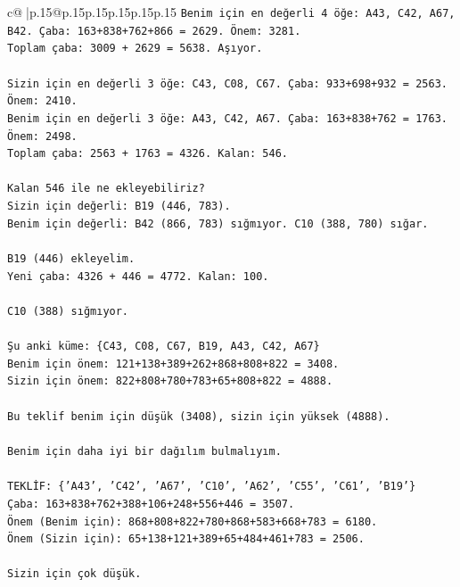 \documentclass{article}
\begin{document}
{\begin{supertabular}{c@{$\;$}|p{.15\linewidth}@{}p{.15\linewidth}p{.15\linewidth}p{.15\linewidth}p{.15\linewidth}p{.15\linewidth}}
{{{\texttt{Benim için en değerli 4 öğe: A43, C42, A67, B42. Çaba: 163+838+762+866 = 2629. Önem: 3281.} \\
\texttt{Toplam çaba: 3009 + 2629 = 5638. Aşıyor.} \\
\\ 
\texttt{Sizin için en değerli 3 öğe: C43, C08, C67. Çaba: 933+698+932 = 2563. Önem: 2410.} \\
\texttt{Benim için en değerli 3 öğe: A43, C42, A67. Çaba: 163+838+762 = 1763. Önem: 2498.} \\
\texttt{Toplam çaba: 2563 + 1763 = 4326. Kalan: 546.} \\
\\ 
\texttt{Kalan 546 ile ne ekleyebiliriz?} \\
\texttt{Sizin için değerli: B19 (446, 783).} \\
\texttt{Benim için değerli: B42 (866, 783) sığmıyor. C10 (388, 780) sığar.} \\
\\ 
\texttt{B19 (446) ekleyelim.} \\
\texttt{Yeni çaba: 4326 + 446 = 4772. Kalan: 100.} \\
\\ 
\texttt{C10 (388) sığmıyor.} \\
\\ 
\texttt{Şu anki küme: \{C43, C08, C67, B19, A43, C42, A67\}} \\
\texttt{Benim için önem: 121+138+389+262+868+808+822 = 3408.} \\
\texttt{Sizin için önem: 822+808+780+783+65+808+822 = 4888.} \\
\\ 
\texttt{Bu teklif benim için düşük (3408), sizin için yüksek (4888).} \\
\\ 
\texttt{Benim için daha iyi bir dağılım bulmalıyım.} \\
\\ 
\texttt{TEKLİF: \{'A43', 'C42', 'A67', 'C10', 'A62', 'C55', 'C61', 'B19'\}} \\
\texttt{Çaba: 163+838+762+388+106+248+556+446 = 3507.} \\
\texttt{Önem (Benim için): 868+808+822+780+868+583+668+783 = 6180.} \\
\texttt{Önem (Sizin için): 65+138+121+389+65+484+461+783 = 2506.} \\
\\ 
\texttt{Sizin için çok düşük.} \\
\\ 
}}}
\end{supertabular}}
\end{document}

